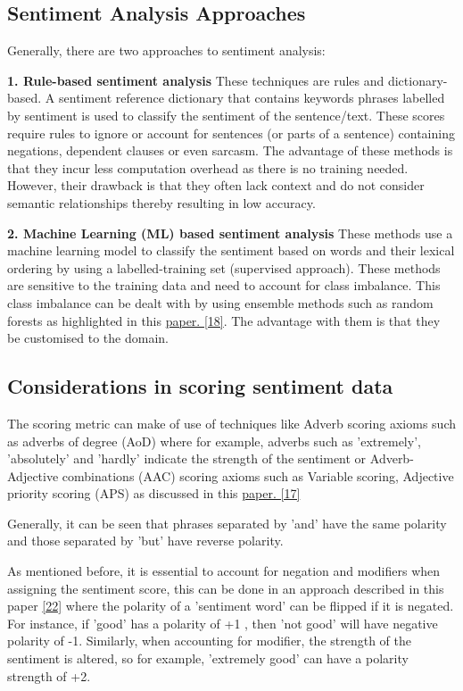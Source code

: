 \subsection{Sentiment Analysis Approaches}

Generally, there are two approaches to sentiment analysis: 

\textbf{1. Rule-based sentiment analysis}
These techniques are rules and dictionary-based. A sentiment reference dictionary that contains keywords phrases labelled by sentiment is used to classify the sentiment of the sentence/text. These scores require rules to ignore or account for sentences (or parts of a sentence) containing negations, dependent clauses or even sarcasm. The advantage of these methods is that they incur less  computation overhead as there is no training needed. However, their drawback is that they often lack context and do not consider semantic relationships thereby resulting in low accuracy. 

\textbf{2. Machine Learning (ML) based sentiment analysis}
These methods use a machine learning model to classify the sentiment based on words and their lexical ordering by using a labelled-training set (supervised approach). These methods are sensitive to the training data and need to account for class imbalance. This class imbalance can be dealt with by using ensemble methods such as random forests as highlighted in this \hyperlink{18}{paper. [18]}. The advantage with them is that they be customised to the domain.

\subsection{Considerations in scoring sentiment data}

The scoring metric can make of use of techniques like Adverb scoring axioms such as adverbs of degree (AoD) where for example, adverbs such as 'extremely', 'absolutely' and 'hardly' indicate the strength of the sentiment or  Adverb-Adjective combinations (AAC) scoring axioms such as Variable scoring, Adjective priority scoring (APS) as discussed in this \hyperlink{17}{paper. [17]}


Generally, it can be seen that phrases separated by 'and' have the same polarity and those separated by 'but' have reverse polarity. 

As mentioned before, it is essential to account for negation and modifiers when assigning the sentiment score, this can be done in an approach described in this paper \hyperlink{22}{[22]} where the polarity of a 'sentiment word' can be flipped if it is negated. For instance, if 'good' has a polarity of +1 , then 'not good' will have negative polarity of -1. Similarly, when accounting for modifier, the strength of the sentiment is altered, so for example, 'extremely good' can have a polarity strength of +2. 


